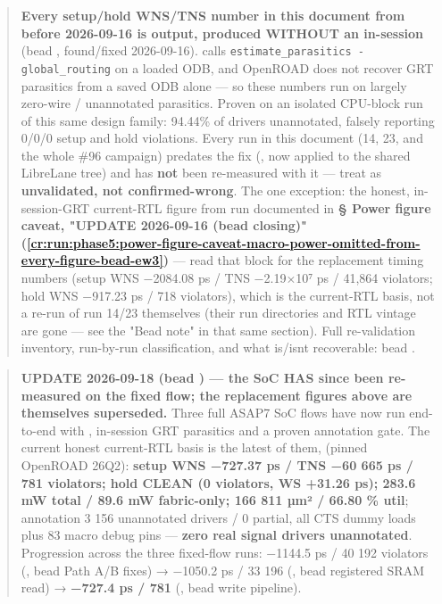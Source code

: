 \begin{record}
\begin{quote}
\warn{} \textbf{Every setup/\allowbreak{}hold WNS/TNS number in this
document from before 2026-09-16 is  output,
produced WITHOUT an in-session } (bead
, found/\allowbreak{}fixed 2026-09-16).
 calls
\texttt{estimate\_\allowbreak{}parasitics\ -\allowbreak{}global\_\allowbreak{}routing}
on a loaded ODB, and OpenROAD does not recover GRT parasitics from a
saved ODB alone --- so these numbers run on largely zero-wire /
unannotated parasitics. Proven on an isolated CPU-block run of this same
design family: 94.44\% of drivers unannotated, falsely reporting 0/0/0
setup and hold violations. Every run in this document (14, 23, and the
whole \#96 campaign) predates the fix
(, now applied to the shared LibreLane
tree) and has \textbf{not} been re-measured with it --- treat as
\textbf{unvalidated, not confirmed-wrong}. The one exception: the
honest, in-session-GRT current-RTL figure from run 
documented in \textbf{§ Power figure caveat, "UPDATE 2026-09-16 (bead
closing)" (\cref{cr:run:phase5:power-figure-caveat-macro-power-omitted-from-every-figure-bead-ew3})}
--- read that block for the replacement timing numbers (setup WNS
−2084.08 ps / TNS −2.19×10⁷ ps / 41,864 violators; hold WNS −917.23 ps /
718 violators), which is the current-RTL basis, not a re-run of run
14/23 themselves (their run directories and RTL vintage are gone --- see
the "Bead  note" in that same section). Full re-validation
inventory, run-by-run classification, and what is/isn\textquotesingle t
recoverable: bead .
\end{quote}

\begin{quote}
\ok{} \textbf{UPDATE 2026-09-18 (bead )
--- the SoC HAS since been re-measured on the fixed flow; the
 replacement figures above are themselves superseded.}
Three full ASAP7 SoC flows have now run end-to-end with
, in-session GRT parasitics and a
proven annotation gate. The current honest current-RTL basis is the
latest of them, 
(pinned OpenROAD 26Q2): \textbf{setup WNS −727.37 ps / TNS −60 665 ps /
781 violators; hold CLEAN (0 violators, WS +31.26 ps); 283.6 mW total /
89.6 mW fabric-only; 166 811 µm² / 66.80 \% util}; annotation 3 156
unannotated drivers / 0 partial, all  CTS dummy loads
plus 83  macro debug pins --- \textbf{zero real signal
drivers unannotated}. Progression across the three fixed-flow runs:
−1144.5 ps / 40 192 violators (, bead
 Path A/B fixes) → −1050.2 ps / 33 196
(, bead  registered SRAM read) →
\textbf{−727.4 ps / 781} (, bead
 write pipeline).


\end{quote}
\end{record}
